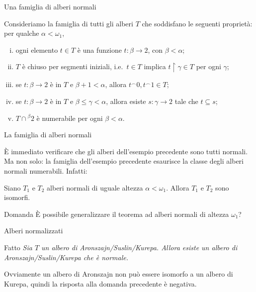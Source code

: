 \documentclass{beamer}
\theoremstyle{num.custom-title}
\theoremstyle{custom-title}
\DeclareMathOperator{\sse}{\subseteq}
\DeclareMathOperator{\restr}{\upharpoonright}
\newcommand{\conc}{^\frown}
\begin{document}
\begin{frame}{Una famiglia di alberi normali}

\begin{example}
Consideriamo la famiglia di tutti gli alberi $T$ che soddisfano le seguenti proprietà: per qualche $\alpha < \omega_1$,
\begin{enumerate}[(i)]
\item ogni elemento $t \in T$ è una funzione $t \colon \beta \to 2$, con $\beta < \alpha$;
\item $T$ è chiuso per segmenti iniziali, i.e.\ $t \in T$ implica $t \restr \gamma \in T$ per ogni $\gamma$;
\item se $t \colon \beta \to 2$ è in $T$ e $\beta+1 < \alpha$, allora $t \conc 0, t \conc 1 \in T$;
\item se $t \colon \beta \to 2$ è in $T$ e $\beta \leq \gamma < \alpha$, allora esiste $s \colon \gamma \to 2$ tale che $t \sse s$;
\item $T \cap {}^{\beta} 2$ è numerabile per ogni $\beta < \alpha$.
\end{enumerate}
\end{example}

\end{frame}


\begin{frame}{La famiglia di alberi normali}

È immediato verificare che gli alberi dell'esempio precedente sono tutti normali. \pause Ma non solo: la famiglia dell'esempio precedente esaurisce la classe degli alberi normali numerabili. Infatti:

\pause

\begin{theorem}
Siano $T_1$ e $T_2$ alberi normali di uguale altezza $\alpha < \omega_1$. Allora $T_1$ e $T_2$ sono isomorfi.
\end{theorem}

\pause

\begin{exampleblock}{Domanda}
È possibile generalizzare il teorema ad alberi normali di altezza $\omega_1$?
\end{exampleblock}

\end{frame}


\begin{frame}{Alberi normalizzati}

\begin{block}{Fatto}
\textit{Sia $T$ un albero di Aronszajn/Suslin/Kurepa. Allora esiste un albero di Aronszajn/Suslin/Kurepa che è normale.}
\end{block}

\pause

Ovviamente un albero di Aronszajn non può essere isomorfo a un albero di Kurepa, quindi la risposta alla domanda precedente è negativa.

\end{frame}
\end{document}
